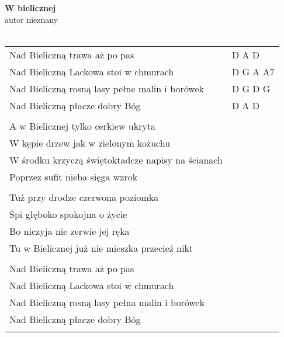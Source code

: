 \documentclass[a5paper]{article}
\begin{document}


\noindent
\fontsize{12pt}{15pt}\selectfont
\textbf{W bielicznej} \\
\fontsize{8pt}{10pt}\selectfont
autor nieznany \\ \\
\fontsize{10pt}{12pt}\selectfont
{}
\begin{tabular}{@{}p{8.50cm}p{3cm}@{}}
\noindent
Nad Bieliczną trawa aż po pas & D A D \\
Nad Bieliczną Lackowa stoi w chmurach & D G A A7 \\
Nad Bieliczną rosną lasy pełne malin i borówek & D G D G \\
Nad Bieliczną płacze dobry Bóg & D A D \\ \\

A w Bielicznej tylko cerkiew ukryta \\
W kępie drzew jak w zielonym kożuchu\\
W środku krzyczą świętoktadcze napisy na ścianach\\
Poprzez sufit nieba sięga wzrok\\\\

Tuż przy drodze czerwona poziomka\\
Śpi głęboko spokojna o życie\\
Bo niczyja nie zerwie jej ręka\\
Tu w Bielicznej już nie mieszka przecież nikt\\\\

Nad Bieliczną trawa aż po pas\\
Nad Bieliczną Lackowa stoi w chmurach\\
Nad Bieliczną rosną lasy pełna malin i borówek\\
Nad Bieliczną płacze dobry Bóg\\ \\
\end{tabular}
\end{document}
